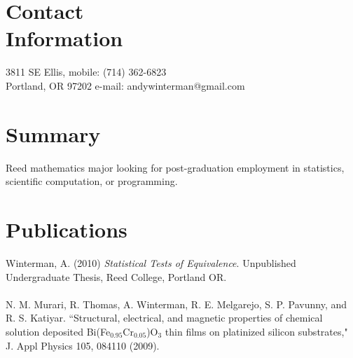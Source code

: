 \documentclass[margin,line]{resume}
\begin{document}
\begin{resume}

    \section{\mysidestyle Contact\\Information}


    3811 SE Ellis,                           \hfill  mobile: (714) 362-6823          \vspace{0mm}\\\vspace{0mm}%
    Portland, OR 97202                         \hfill     e-mail: andywinterman@gmail.com      \vspace{0mm}\\%
  \vspace{-4.5mm}%

    \section{\mysidestyle Summary}

Reed mathematics major looking for post-graduation employment in statistics, scientific computation, or programming.


\section{\mysidestyle Publications}
Winterman, A. (2010) \textit{Statistical Tests of Equivalence}. Unpublished Undergraduate Thesis, Reed College, Portland OR. \\
\vspace{-2mm} \\
 N. M. Murari, R. Thomas, A. Winterman, R. E. Melgarejo, S. P. Pavunny, and R. S. Katiyar. ``Structural, electrical, and magnetic properties of chemical solution deposited Bi(Fe$_{0.95}$Cr$_{0.05}$)O$_3$ thin films on platinized silicon substrates," J. Appl Physics 105, 084110 (2009).     %

\end{resume}
\end{document}
